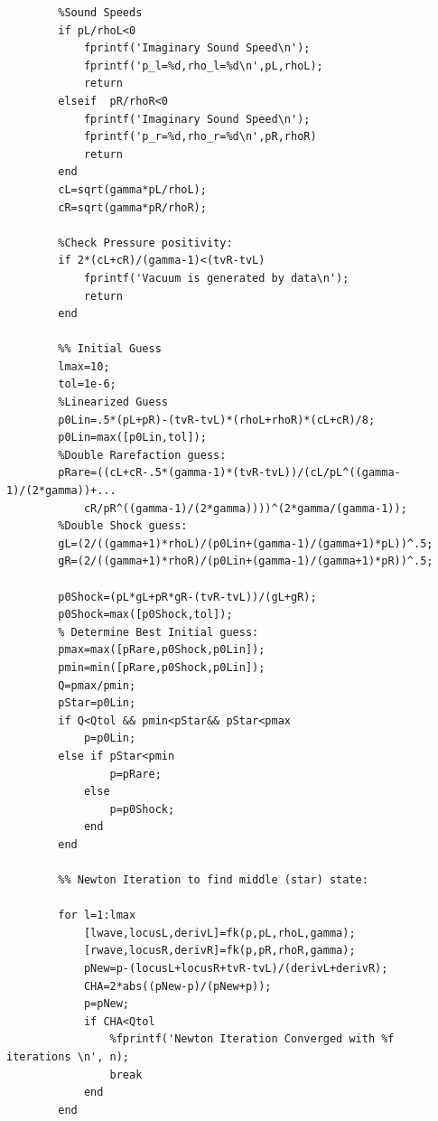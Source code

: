 \begin{lstlisting}
        %Sound Speeds
        if pL/rhoL<0
            fprintf('Imaginary Sound Speed\n');
            fprintf('p_l=%d,rho_l=%d\n',pL,rhoL);
            return
        elseif  pR/rhoR<0
            fprintf('Imaginary Sound Speed\n');
            fprintf('p_r=%d,rho_r=%d\n',pR,rhoR)
            return
        end
        cL=sqrt(gamma*pL/rhoL);
        cR=sqrt(gamma*pR/rhoR);
        
        %Check Pressure positivity:
        if 2*(cL+cR)/(gamma-1)<(tvR-tvL)
            fprintf('Vacuum is generated by data\n');
            return
        end
        
        %% Initial Guess
        lmax=10;
        tol=1e-6;
        %Linearized Guess
        p0Lin=.5*(pL+pR)-(tvR-tvL)*(rhoL+rhoR)*(cL+cR)/8;
        p0Lin=max([p0Lin,tol]);
        %Double Rarefaction guess:
        pRare=((cL+cR-.5*(gamma-1)*(tvR-tvL))/(cL/pL^((gamma-1)/(2*gamma))+...
            cR/pR^((gamma-1)/(2*gamma))))^(2*gamma/(gamma-1));
        %Double Shock guess:
        gL=(2/((gamma+1)*rhoL)/(p0Lin+(gamma-1)/(gamma+1)*pL))^.5;
        gR=(2/((gamma+1)*rhoR)/(p0Lin+(gamma-1)/(gamma+1)*pR))^.5;
        
        p0Shock=(pL*gL+pR*gR-(tvR-tvL))/(gL+gR);
        p0Shock=max([p0Shock,tol]);
        % Determine Best Initial guess:
        pmax=max([pRare,p0Shock,p0Lin]);
        pmin=min([pRare,p0Shock,p0Lin]);
        Q=pmax/pmin;
        pStar=p0Lin;
        if Q<Qtol && pmin<pStar&& pStar<pmax
            p=p0Lin;
        else if pStar<pmin
                p=pRare;
            else
                p=p0Shock;
            end
        end
        
        %% Newton Iteration to find middle (star) state:
        
        for l=1:lmax
            [lwave,locusL,derivL]=fk(p,pL,rhoL,gamma);
            [rwave,locusR,derivR]=fk(p,pR,rhoR,gamma);
            pNew=p-(locusL+locusR+tvR-tvL)/(derivL+derivR);
            CHA=2*abs((pNew-p)/(pNew+p));
            p=pNew;
            if CHA<Qtol
                %fprintf('Newton Iteration Converged with %f iterations \n', n);
                break
            end
        end
        

\end{lstlisting}
